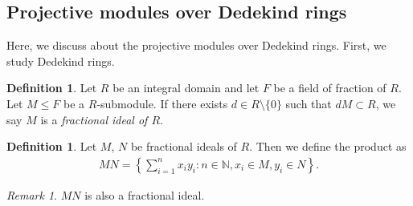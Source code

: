 \documentclass[12pt]{article}
\theoremstyle{plain}
\theoremstyle{remark}
\newtheorem*{remark}{Remark}
\theoremstyle{definition}
\newtheorem{definition}[theorem]{Definition}
\newcommand{\N}{\mathbb{N}}
\begin{document}
\subsection{Projective modules over Dedekind rings}

Here, we discuss about the projective modules over Dedekind rings. First, we study Dedekind rings.

\begin{definition}
    Let $R$ be an integral domain and let $F$ be a field of fraction of $R$. Let $M\le F$ be a $R$-submodule. If there exists $d\in R\setminus\{0\}$ such that $dM\subset R$, we say $M$ is a \emph{fractional ideal of $R$}.
\end{definition}

\begin{definition}
    Let $M$, $N$ be fractional ideals of $R$. Then we define the product as
    \begin{align*}
        MN = \left\{ \sum_{i=1}^n x_iy_i:n\in\N,x_i\in M,y_i\in N \right\}.
    \end{align*}
\end{definition}
\begin{remark}
    $MN$ is also a fractional ideal.
\end{remark}
\end{document}
